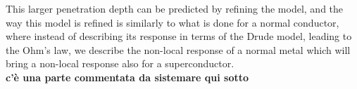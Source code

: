 This larger penetration depth can be predicted by refining the model, and the way this model is refined is similarly to what is done for a normal conductor, where instead of describing its response in terms of the Drude model, leading to the Ohm's law, we describe the non-local response of a normal metal which will bring a non-local response also for a superconductor.\\
\textbf{c'è una parte commentata da sistemare qui sotto}\\

